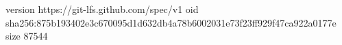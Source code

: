 version https://git-lfs.github.com/spec/v1
oid sha256:875b193402e3c670095d1d632db4a78b6002031e73f23ff929f47ca922a0177e
size 87544
